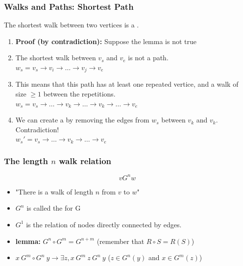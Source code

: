 \documentclass{beamer}
\begin{document}
\begin{frame}
  \frametitle{Walks and Paths: Shortest Path}

  {\larger
    {\bf {}} The shortest walk between two vertices is a
    .
    \begin{enumerate}
    \item {\bf Proof (by contradiction):} Suppose the lemma is not true

      \bigskip

    \item The shortest walk between $v_s$ and $v_e$ is not a path.\\
      $w_s = v_s \rightarrow v_i \rightarrow \ldots \rightarrow v_j \rightarrow v_e$

      \bigskip

    \item This means that this path has at least one repeated vertice, and a walk of size $\geq 1$ between the repetitions.\\
      $w_s = v_s \rightarrow \ldots \rightarrow v_k \rightarrow \ldots \rightarrow v_k \rightarrow \ldots \rightarrow v_e$

      \bigskip

    \item We can create a  by removing the edges from $w_s$ between $v_k$ and $v_k$. \alert{Contradiction!}\\
      $w_s' = v_s \rightarrow \ldots \rightarrow v_k \rightarrow \ldots  \rightarrow v_e$
    \end{enumerate}

  }
\end{frame}

\begin{frame}
  \frametitle{The length $n$ walk relation}

    {\huge
  \begin{equation}
    v G^n w
  \end{equation}
    }
  \begin{itemize}
    \item "There is a walk of length $n$ from $v$ to $w$"
    \item $G^n$ is called the  for G
  \end{itemize}

  \vfill
  \begin{itemize}
  \item $G^1$ is the relation of nodes directly connected by edges.
  \item {\bf lemma:} $G^n \circ G^m = G^{n+m}$
    \hfill (remember that $R\circ S = R(S)$)
  \item $x~G^m \circ G^n~y \rightarrow \exists z, x~G^m~z~G^n~y$
    \hfill ($z \in G^n(y)$ and $x \in G^m(z)$)
  \end{itemize}
\end{frame}
\end{document}
